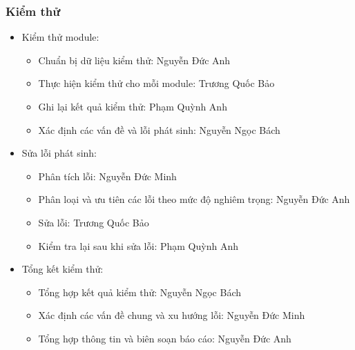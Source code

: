 \documentclass[12pt]{article}
\begin{document}
\subsubsection{Kiểm thử}
\begin{itemize}[label=-, leftmargin=1cm]
    \item Kiểm thử module:
    \begin{itemize}[label=+, leftmargin=1cm]
        \item Chuẩn bị dữ liệu kiểm thử: Nguyễn Đức Anh
        \item Thực hiện kiểm thử cho mỗi module: Trương Quốc Bảo
        \item Ghi lại kết quả kiểm thử: Phạm Quỳnh Anh
        \item Xác định các vấn đề và lỗi phát sinh: Nguyễn Ngọc Bách
    \end{itemize}
    \item Sửa lỗi phát sinh: 
    \begin{itemize}[label=+, leftmargin=1cm]
        \item Phân tích lỗi: Nguyễn Đức Minh
        \item Phân loại và ưu tiên các lỗi theo mức độ nghiêm trọng: Nguyễn Đức Anh
        \item Sửa lỗi: Trương Quốc Bảo
        \item Kiểm tra lại sau khi sửa lỗi: Phạm Quỳnh Anh
    \end{itemize}
    \item Tổng kết kiểm thử:
    \begin{itemize}[label=+, leftmargin=1cm]
        \item Tổng hợp kết quả kiểm thử: Nguyễn Ngọc Bách
        \item Xác định các vấn đề chung và xu hướng lỗi: Nguyễn Đức Minh
        \item Tổng hợp thông tin và biên soạn báo cáo: Nguyễn Đức Anh
    \end{itemize}
\end{itemize}
\end{document}
